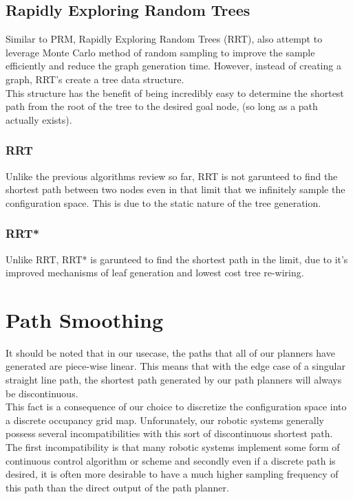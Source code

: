 \documentclass[journal]{IEEEtran}
\begin{document}
\subsection{Rapidly Exploring Random Trees}
Similar to PRM, Rapidly Exploring Random Trees (RRT), also attempt to leverage Monte Carlo method of random sampling to improve the sample efficiently and reduce the graph generation time. However, instead of creating a graph, RRT's create a tree data structure. \\

This structure has the benefit of being incredibly easy to determine the shortest path from the root of the tree to the desired goal node, (so long as a path actually exists).


\subsubsection{RRT}

Unlike the previous algorithms review so far, RRT is not garunteed to find the shortest path between two nodes even in that limit that we infinitely sample the configuration space. This is due to the static nature of the tree generation. 

\subsubsection{RRT*}

Unlike RRT, RRT* is garunteed to find the shortest path in the limit, due to it's improved mechanisms of leaf generation and lowest cost tree re-wiring. 


\section{Path Smoothing}

It should be noted that in our usecase, the paths that all of our planners have generated are piece-wise linear. This means that with the edge case of a singular straight line path, the shortest path generated by our path planners will always be discontinuous. \\

This fact is a consequence of our choice to discretize the configuration space into a discrete occupancy grid map. Unforunately, our robotic systems generally possess several incompatibilities with this sort of discontinuous shortest path. \\

The first incompatibility is that many robotic systems implement some form of continuous control algorithm or scheme and secondly even if a discrete path is desired, it is often more desirable to have a much higher sampling frequency of this path than the direct output of the path planner. \\
\end{document}
